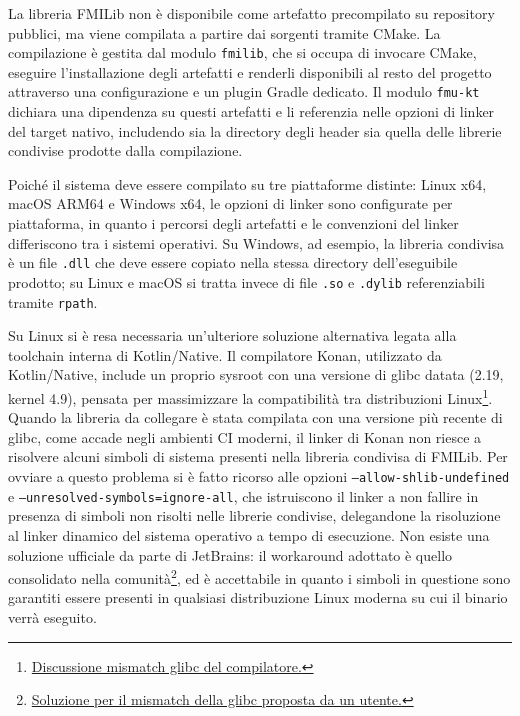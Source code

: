La libreria FMILib non è disponibile come artefatto precompilato su repository pubblici, ma viene compilata a partire dai sorgenti tramite CMake. La compilazione è gestita dal modulo \texttt{fmilib}, che si occupa di invocare CMake, eseguire l'installazione degli artefatti e renderli disponibili al resto del progetto attraverso una configurazione e un plugin Gradle dedicato. Il modulo \texttt{fmu-kt} dichiara una dipendenza su questi artefatti e li referenzia nelle opzioni di linker del target nativo, includendo sia la directory degli header sia quella delle librerie condivise prodotte dalla compilazione.

Poiché il sistema deve essere compilato su tre piattaforme distinte: Linux x64, macOS ARM64 e Windows x64, le opzioni di linker sono configurate per piattaforma, in quanto i percorsi degli artefatti e le convenzioni del linker differiscono tra i sistemi operativi. Su Windows, ad esempio, la libreria condivisa è un file \texttt{.dll} che deve essere copiato nella stessa directory dell'eseguibile prodotto; su Linux e macOS si tratta invece di file \texttt{.so} e \texttt{.dylib} referenziabili tramite \texttt{rpath}.

Su Linux si è resa necessaria un'ulteriore soluzione alternativa legata alla toolchain interna di Kotlin/Native. Il compilatore Konan, utilizzato da Kotlin/Na\-tive, include un proprio sysroot con una versione di glibc datata (2.19, kernel 4.9), pensata per massimizzare la compatibilità tra distribuzioni Linux\footnote{\href{https://slack-chats.kotlinlang.org/t/527558/upon-developing-a-basic-program-to-my-horror-a-critical-bug-}{Discussione mismatch glibc del compilatore.}}. Quando la libreria da collegare è stata compilata con una versione più recente di glibc, come accade negli ambienti CI moderni, il linker di Konan non riesce a risolvere alcuni simboli di sistema presenti nella libreria condivisa di FMILib. Per ovviare a questo problema si è fatto ricorso alle opzioni \texttt{--allow-shlib-undefined} e \texttt{--unresolved-symbols=ignore-all}, che istruiscono il linker a non fallire in presenza di simboli non risolti nelle librerie condivise, delegandone la risoluzione al linker dinamico del sistema operativo a tempo di esecuzione. Non esiste una soluzione ufficiale da parte di JetBrains: il workaround adottato è quello consolidato nella comunità\footnote{\href{https://discuss.kotlinlang.org/t/mismatch-between-glibc-versions-kotlin-native-on-linux/30780}{Soluzione per il mismatch della glibc proposta da un utente.}}, ed è accettabile in quanto i simboli in questione sono garantiti essere presenti in qualsiasi distribuzione Linux moderna su cui il binario verrà eseguito.


